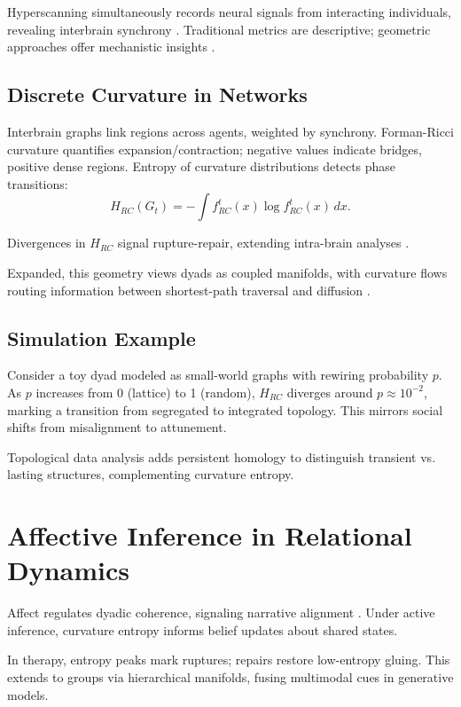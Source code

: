 \documentclass{article}
\theoremstyle{definition}
\begin{document}
Hyperscanning simultaneously records neural signals from interacting individuals, revealing interbrain synchrony \cite{montague2002hyperscanning}. Traditional metrics are descriptive; geometric approaches offer mechanistic insights \cite{hinrichs2025geometry}.

\subsection{Discrete Curvature in Networks}

Interbrain graphs link regions across agents, weighted by synchrony. Forman-Ricci curvature quantifies expansion/contraction; negative values indicate bridges, positive dense regions. Entropy of curvature distributions detects phase transitions:
\[
H_{RC}(G_t) = -\int f^t_{RC}(x) \log f^t_{RC}(x) \, dx.
\]

Divergences in $H_{RC}$ signal rupture-repair, extending intra-brain analyses \cite{weber2019curvature,chatterjee2021detecting}.

Expanded, this geometry views dyads as coupled manifolds, with curvature flows routing information between shortest-path traversal and diffusion \cite{avena2019spectrum}.

\subsection{Simulation Example}

Consider a toy dyad modeled as small-world graphs with rewiring probability $p$. As $p$ increases from 0 (lattice) to 1 (random), $H_{RC}$ diverges around $p \approx 10^{-2}$, marking a transition from segregated to integrated topology. This mirrors social shifts from misalignment to attunement.

Topological data analysis adds persistent homology to distinguish transient vs. lasting structures, complementing curvature entropy.

\section{Affective Inference in Relational Dynamics}

Affect regulates dyadic coherence, signaling narrative alignment \cite{hinrichs2025hyperscanning}. Under active inference, curvature entropy informs belief updates about shared states.

In therapy, entropy peaks mark ruptures; repairs restore low-entropy gluing. This extends to groups via hierarchical manifolds, fusing multimodal cues in generative models.
\end{document}
